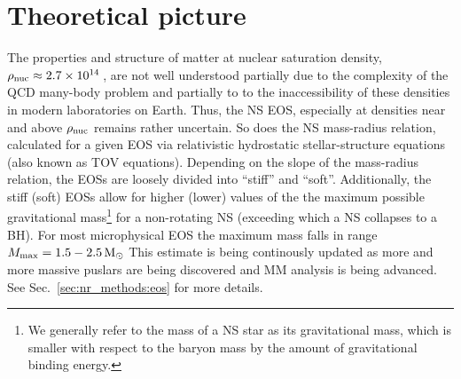 


\section{Theoretical picture}

The properties and structure of matter at nuclear saturation density, 
$\rho_{\rm nuc}\approx2.7\times10^{14}\,$\gcm, are not well understood partially due to 
the complexity of the \ac{QCD} many-body problem and partially to to the 
inaccessibility of these densities in modern laboratories on Earth. Thus, the \ac{NS} 
\ac{EOS}, especially at densities near and above $\rho_{\rm nuc}$ remains rather uncertain.
So does the \ac{NS} mass-radius relation, calculated for a given \ac{EOS} via relativistic 
hydrostatic stellar-structure equations (also known as \ac{TOV} equations). 
Depending on the slope of the mass-radius relation, the \acp{EOS} are loosely divided into 
``stiff'' and ``soft''. Additionally, the stiff (soft) \acp{EOS} allow for higher (lower) 
values of the the maximum possible gravitational mass\footnote{
    We generally refer to the mass of a \ac{NS} star as its gravitational mass, which 
    is smaller with respect to the baryon mass by the amount of gravitational 
    binding energy. 
} for a non-rotating \ac{NS} (exceeding which a \ac{NS} collapses to a \ac{BH}).
For most microphysical \ac{EOS} 
the maximum mass falls in range $M_{\rm max}=1.5-2.5\,{\text{M}_{\odot}}$ \cite{e.g. Lattimer & Prakash, 2000)}
This estimate is being continously updated as more and more massive puslars are being 
discovered \cite{e.g. Demorest et al., 2010} and \ac{MM} analysis is being advanced.
See Sec.~\ref{sec:nr_methods:eos} for more details.

